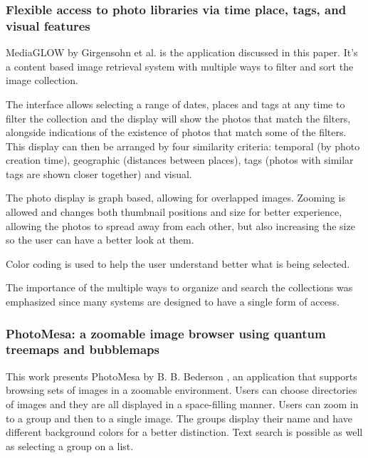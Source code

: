 
\subsubsection{Flexible access to photo libraries via time place, tags, and visual features} %
\label{sub:Girgensohn}

MediaGLOW by Girgensohn et al. \cite{Girgensohn:2010} is the application discussed in this paper. It's a content based image retrieval system with multiple ways to filter and sort the image collection.

The interface allows selecting a range of dates, places and tags at any time to filter the collection and the display will show the photos that match the filters, alongside indications of the existence of photos that match some of the filters. This display can then be arranged by four similarity criteria: temporal (by photo creation time), geographic (distances between places), tags (photos with similar tags are shown closer together) and visual.

The photo display is graph based, allowing for overlapped images. Zooming is allowed and changes both thumbnail positions and size for better experience, allowing the photos to spread away from each other, but also increasing the size so the user can have a better look at them.

Color coding is used to help the user understand better what is being selected.

The importance of the multiple ways to organize and search the collections was emphasized since many systems are designed to have a single form of access.



\subsubsection{PhotoMesa: a zoomable image browser using quantum treemaps and bubblemaps}
\label{sub:PhotoMesa}

This work presents PhotoMesa by B. B. Bederson \cite{Bederson:2001:PZI:502348.502359}, an application that supports browsing sets of images in a zoomable environment. Users can choose directories of images and they are all displayed in a space-filling manner. Users can zoom in to a group and then to a single image. The groups display their name and have different background colors for a better distinction. Text search is possible as well as selecting a group on a list.


